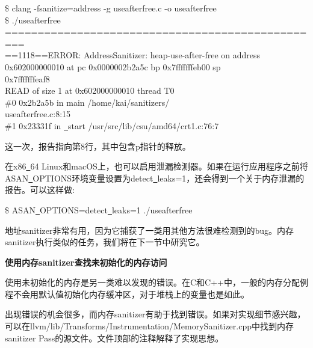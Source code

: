 \begin{tcolorbox}[colback=white,colframe=black]
\$ clang -fsanitize=address -g useafterfree.c -o useafterfree \\
\$ ./useafterfree \\
============================================== \\
=== \\
==1118==ERROR: AddressSanitizer: heap-use-after-free on address \\
0x602000000010 at pc 0x0000002b2a5c bp 0x7fffffffeb00 sp \\
0x7fffffffeaf8 \\
READ of size 1 at 0x602000000010 thread T0 \\
\hspace*{1cm}\#0 0x2b2a5b in main /home/kai/sanitizers/ \\
useafterfree.c:8:15 \\
\hspace*{1cm}\#1 0x23331f in \underline{~}start  /usr/src/lib/csu/amd64/crt1.c:76:7
\end{tcolorbox}

这一次，报告指向第8行，其中包含p指针的释放。\par

在x86\underline{~}64 Linux和macOS上，也可以启用泄漏检测器。如果在运行应用程序之前将ASAN\underline{~}OPTIONS环境变量设置为detect\underline{~}leaks=1，还会得到一个关于内存泄漏的报告。可以这样做:\par

\begin{tcolorbox}[colback=white,colframe=black]
\$ ASAN\underline{~}OPTIONS=detect\underline{~}leaks=1 ./useafterfree
\end{tcolorbox}

地址sanitizer非常有用，因为它捕获了一类用其他方法很难检测到的bug。内存sanitizer执行类似的任务，我们将在下一节中研究它。\par

\hspace*{\fill} \par %
\textbf{使用内存sanitizer查找未初始化的内存访问}

使用未初始化的内存是另一类难以发现的错误。在C和C++中，一般的内存分配例程不会用默认值初始化内存缓冲区，对于堆栈上的变量也是如此。\par

出现错误的机会很多，而内存sanitizer有助于找到错误。如果对实现细节感兴趣，可以在llvm/lib/Transforms/Instrumentation/MemorySanitizer.cpp中找到内存sanitizer Pass的源文件。文件顶部的注释解释了实现思想。\par

